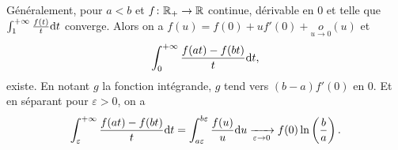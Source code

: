 \begin{remark}
    Généralement, pour $a<b$ et $f\colon\mathbb{R}_{+}\to\mathbb{R}$ continue, dérivable en 0 et telle que $\int_{1}^{+\infty}\frac{f(t)}{t}\mathrm{d} t$ converge. Alors on a $f(u)=f(0)+uf'(0)+\underset{u\to0}{o}(u)$ et 
    \begin{equation}
        \int_{0}^{+\infty}\frac{f(at)-f(bt)}{t}\mathrm{d} t,
    \end{equation}
    existe. En notant $g$ la fonction intégrande, $g$ tend vers $(b-a)f'(0)$ en 0. Et en séparant pour $\varepsilon>0$, on a 
    \begin{equation}
        \int_{\varepsilon}^{+\infty}\frac{f(at)-f(bt)}{t}\mathrm{d} t=\int_{a\varepsilon}^{b\varepsilon}\frac{f(u)}{u}\mathrm{d} u\xrightarrow[\varepsilon\to0]{}f(0)\ln\left(\frac{b}{a}\right).
    \end{equation}
\end{remark}